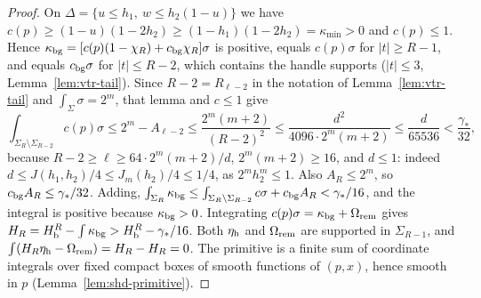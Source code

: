 \begin{proof}
On $\Delta=\{u\le h_1,\ w\le h_2(1-u)\}$ we have $c(p)\ge(1-u)(1-2h_2)\ge(1-h_1)(1-2h_2)=\kappa_{\min}>0$ and $c(p)\le1$. Hence
$\kappa_{\rm bg}=[c(p)(1-\chi_R)+c_{\rm bg}\chi_R]\sigma$ is positive, equals $c(p)\sigma$ for $|t|\ge R-1$, and equals $c_{\rm bg}\sigma$ for
$|t|\le R-2$, which contains the handle supports ($|t|\le3$, Lemma~\ref{lem:vtr-tail}). Since $R-2=R_{\ell-2}$ in the notation
of Lemma~\ref{lem:vtr-tail} and $\int_\Sigma\sigma=2^m$, that lemma and $c\le1$ give
\[
 \int_{\Sigma_R\setminus\Sigma_{R-2}}c(p)\sigma\le2^m-A_{\ell-2}
 \le\frac{2^m(m+2)}{(R-2)^2}\le\frac{d^2}{4096\cdot2^m(m+2)}\le\frac d{65536}<\frac{\gamma_*}{32},
\]
because $R-2\ge\ell\ge64\cdot2^m(m+2)/d$, $2^m(m+2)\ge16$, and $d\le1$: indeed
$d\le J(h_1,h_2)/4\le J_m(h_2)/4\le1/4$, as $2^mh_2^m\le1$. Also $A_R\le2^m$, so $c_{\rm bg}A_R\le\gamma_*/32$. Adding,
$\int_{\Sigma_R}\kappa_{\rm bg}\le\int_{\Sigma_R\setminus\Sigma_{R-2}}c\sigma+c_{\rm bg}A_R<\gamma_*/16$, and the integral is positive because
$\kappa_{\rm bg}>0$. Integrating $c(p)\sigma=\kappa_{\rm bg}+\Omega_{\rm rem}$ gives $H_R=H_{\mathrm b}^R-\int\kappa_{\rm bg}>H_{\mathrm b}^R-\gamma_*/16$.
Both $\eta_{\rm h}$ and $\Omega_{\rm rem}$ are supported in $\Sigma_{R-1}$, and $\int(H_R\eta_{\rm h}-\Omega_{\rm rem})=H_R-H_R=0$. The
primitive is a finite sum of coordinate integrals over fixed compact boxes of smooth functions of $(p,x)$, hence smooth in $p$
(Lemma~\ref{lem:shd-primitive}).
\end{proof}
